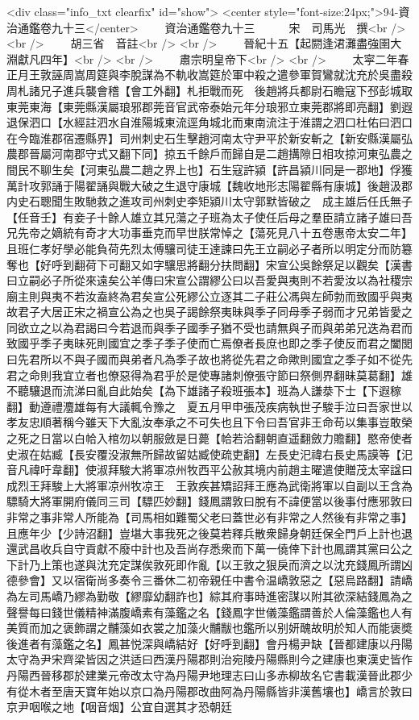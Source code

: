<div class="info_txt clearfix" id="show">
<center style="font-size:24px;">94-資治通鑑卷九十三</center>
  　　資治通鑑卷九十三　　　宋　司馬光　撰<br />
<br />
　　胡三省　音註<br />
<br />
　　晉紀十五【起閼逢涒灘盡強圉大淵獻凡四年】<br />
<br />
　　肅宗明皇帝下<br />
<br />
　　太寜二年春正月王敦誣周嵩周筵與李脫謀為不軌收嵩筵於軍中殺之遣參軍賀鸞就沈充於吳盡殺周札諸兄子進兵襲會稽【會工外翻】札拒戰而死　後趙將兵都尉石瞻寇下邳彭城取東莞東海【東莞縣漢屬琅邪郡莞音官武帝泰始元年分琅邪立東莞郡將即亮翻】劉遐退保泗口【水經註泗水自淮陽城東流逕角城北而東南流注于淮謂之泗口杜佑曰泗口在今臨淮郡宿遷縣界】司州刺史石生擊趙河南太守尹平於新安斬之【新安縣漢屬弘農郡晉屬河南郡守式又翻下同】掠五千餘戶而歸自是二趙搆隙日相攻掠河東弘農之間民不聊生矣【河東弘農二趙之界上也】石生寇許潁【許昌潁川同是一郡地】俘獲萬計攻郭誦于陽翟誦與戰大破之生退守康城【魏收地形志陽翟縣有康城】後趙汲郡内史石聰聞生敗馳救之進攻司州刺史李矩潁川太守郭默皆破之　成主雄后任氏無子【任音壬】有妾子十餘人雄立其兄蕩之子班為太子使任后母之羣臣請立諸子雄曰吾兄先帝之嫡統有奇才大功事垂克而早世朕常悼之【蕩死見八十五卷惠帝太安二年】且班仁孝好學必能負荷先烈太傅驤司徒王達諫曰先王立嗣必子者所以明定分而防簒奪也【好呼到翻荷下可翻又如字驤思將翻分扶問翻】宋宣公吳餘祭足以觀矣【漢書曰立嗣必子所從來遠矣公羊傳曰宋宣公謂繆公曰以吾愛與夷則不若愛汝以為社稷宗廟主則與夷不若汝盍終為君矣宣公死繆公立逐其二子莊公馮與左師勃而致國乎與夷故君子大居正宋之禍宣公為之也吳子謁餘祭夷昧與季子同母季子弱而才兄弟皆愛之同欲立之以為君謁曰今若退而與季子國季子猶不受也請無與子而與弟弟兄迭為君而致國乎季子夷昧死則國宜之季子季子使而亡焉僚者長庶也即之季子使反而君之闔閭曰先君所以不與子國而與弟者凡為季子故也將從先君之命歟則國宜之季子如不從先君之命則我宜立者也僚惡得為君乎於是使專諸刺僚張守節曰祭側界翻昧莫葛翻】雄不聽驤退而流涕曰亂自此始矣【為下雄諸子殺班張本】班為人謙㳟下士【下遐稼翻】動遵禮灋雄每有大議輒令豫之　夏五月甲申張茂疾病執世子駿手泣曰吾家世以孝友忠順著稱今雖天下大亂汝奉承之不可失也且下令曰吾官非王命苟以集事豈敢榮之死之日當以白帢入棺勿以朝服斂是日薨【帢若洽翻朝直遥翻斂力贍翻】愍帝使者史淑在姑臧【長安覆没淑無所歸故留姑臧使疏吏翻】左長史汜禕右長史馬謨等【汜音凡禕吁韋翻】使淑拜駿大將軍凉州牧西平公赦其境内前趙主曜遣使贈茂太宰諡曰成烈王拜駿上大將軍凉州牧凉王　王敦疾甚矯詔拜王應為武衛將軍以自副以王含為驃騎大將軍開府儀同三司【驃匹妙翻】錢鳳謂敦曰脫有不諱便當以後事付應邪敦曰非常之事非常人所能為【司馬相如難蜀父老曰蓋世必有非常之人然後有非常之事】且應年少【少詩沼翻】豈堪大事我死之後莫若釋兵散衆歸身朝廷保全門戶上計也退還武昌收兵自守貢獻不廢中計也及吾尚存悉衆而下萬一僥倖下計也鳳謂其黨曰公之下計乃上策也遂與沈充定謀俟敦死即作亂【以王敦之狠戾而濟之以沈充錢鳳所謂凶德參會】又以宿衛尚多奏令三番休二初帝親任中書令温嶠敦惡之【惡烏路翻】請嶠為左司馬嶠乃繆為勤敬【繆靡幼翻詐也】綜其府事時進密謀以附其欲深結錢鳳為之聲譽每曰錢世儀精神滿腹嶠素有藻鑑之名【錢鳳字世儀藻鑑謂善於人倫藻鑑也人有美質而加之褒飾謂之黼藻如衣裳之加藻火黼黻也鑑所以别妍醜故明於知人而能褒奬後進者有藻鑑之名】鳳甚悦深與嶠結好【好呼到翻】會丹楊尹缺【晉都建康以丹陽太守為尹宋齊梁皆因之洪适曰西漢丹陽郡則治宛陵丹陽縣則今之建康也東漢史皆作丹陽西晉移郡於建業元帝改太守為丹陽尹地理志曰山多赤柳故名它書載漢晉此郡少有從木者至唐天寶年始以京口為丹陽郡改曲阿為丹陽縣皆非漢舊壤也】嶠言於敦曰京尹咽喉之地【咽音烟】公宜自選其才恐朝廷